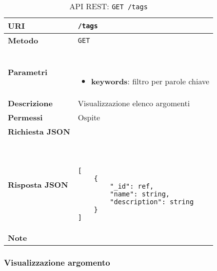         \begin{table}[H]
            \begin{center}
                \begin{tabular}{p{} p{}}
                    \toprule
                    \textbf{URI} & \texttt{/tags} \\ \midrule
                    \textbf{Metodo} & \texttt{GET} \\ \midrule
                    \textbf{Parametri} & \
                        \begin{itemize}
                            \item \textbf{keywords}: filtro per parole chiave
                        \end{itemize}
                        \\ \midrule
                    \textbf{Descrizione} & Visualizzazione elenco argomenti \\ \midrule
                    \textbf{Permessi} & Ospite \\ \midrule
                    \textbf{Richiesta JSON} & \\ \midrule
                    \textbf{Risposta JSON} & \
                        \begin{lstlisting}[basicstyle={\ttfamily}]
[
    {
        "_id": ref,
        "name": string,
       	"description": string
    }
]
                        \end{lstlisting}
                        \\ \midrule
                    \textbf{Note} & \\
                    \bottomrule
                \end{tabular}
                \caption{API REST: \texttt{GET /tags}}
            \end{center}
        \end{table}

    \subsubsection{Visualizzazione argomento}

